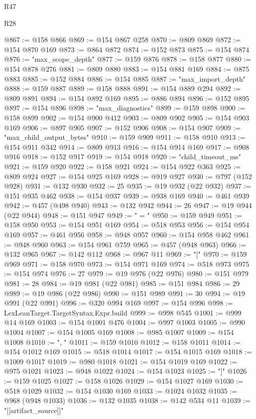 \begin{lexlean}{R47}
\begin{lexlean}{R28}
\begin{coremodule}
{{{{{{{{{{{{{{{{{{{{{{{{{{{{{{{{{{{{{{{{{{{{{{{{{{{{{{{{{{{{{{{{{{{{{{{{{{{{{{{{{{{{{{{{{{{{{{{{{{{{{{{{{{{{{{{{{{{{{{{{{{{{{{{{{{{{{@867 := @158 @866
@869 := @154 @867 @258
@870 := @809 @869
@872 := @154 @870 @169
@873 := @864 @872
@874 := @152 @873
@875 := @154 @874
@876 := "max_scope_depth"
@877 := @159 @876
@878 := @158 @877
@880 := @154 @878 @276
@881 := @809 @880
@883 := @154 @881 @169
@884 := @875 @883
@885 := @152 @884
@886 := @154 @885
@887 := "max_import_depth"
@888 := @159 @887
@889 := @158 @888
@891 := @154 @889 @294
@892 := @809 @891
@894 := @154 @892 @169
@895 := @886 @894
@896 := @152 @895
@897 := @154 @896
@898 := "max_diagnostics"
@899 := @159 @898
@900 := @158 @899
@902 := @154 @900 @412
@903 := @809 @902
@905 := @154 @903 @169
@906 := @897 @905
@907 := @152 @906
@908 := @154 @907
@909 := "max_child_output_bytes"
@910 := @159 @909
@911 := @158 @910
@913 := @154 @911 @342
@914 := @809 @913
@916 := @154 @914 @169
@917 := @908 @916
@918 := @152 @917
@919 := @154 @918
@920 := "child_timeout_ms"
@921 := @159 @920
@922 := @158 @921
@924 := @154 @922 @363
@925 := @809 @924
@927 := @154 @925 @169
@928 := @919 @927
@930 := @797 (@152 @928)
@931 := @132 @930
@932 := 25
@935 := @19 @932 (@22 @932)
@937 := @151 @935 @462
@938 := @154 @937
@939 := @938 @169
@940 := @461 @939
@942 := @457 (@498 @940)
@943 := @132 @942
@944 := 26
@947 := @19 @944 (@22 @944)
@948 := @151 @947
@949 := " = "
@950 := @159 @949
@951 := @158 @950
@953 := @154 @951 @169
@954 := @518 @953
@956 := @154 @954 @169
@957 := @461 @956
@958 := @948 @957
@960 := @154 @958 @462
@961 := @948 @960
@963 := @154 @961 @759
@965 := @457 (@948 @963)
@966 := @132 @965
@967 := @142 @112
@968 := @967 @11
@969 := "["
@970 := @159 @969
@971 := @158 @970
@973 := @154 @971 @169
@974 := @518 @973
@975 := @154 @974
@976 := 27
@979 := @19 @976 (@22 @976)
@980 := @151 @979
@981 := 28
@984 := @19 @981 (@22 @981)
@985 := @151 @984
@986 := 29
@989 := @19 @986 (@22 @986)
@990 := @151 @989
@991 := 30
@994 := @19 @991 (@22 @991)
@996 := @320 @994 @169
@997 := @154 @996
@998 := LexLeanTarget.TargetSyntax.Expr.build
@999 := @998 @545
@1001 := @999 @14 @169
@1003 := @154 @1001 @476
@1004 := @997 @1003
@1005 := @990 @1004
@1007 := @154 @1005 @169
@1008 := @985 @1007
@1009 := @154 @1008
@1010 := ", "
@1011 := @159 @1010
@1012 := @158 @1011
@1014 := @154 @1012 @169
@1015 := @518 @1014
@1017 := @154 @1015 @169
@1018 := @1009 @1017
@1019 := @980 @1018
@1021 := @154 @1019 @169
@1022 := @975 @1021
@1023 := @948 @1022
@1024 := @154 @1023
@1025 := "]"
@1026 := @159 @1025
@1027 := @158 @1026
@1029 := @154 @1027 @169
@1030 := @518 @1029
@1032 := @154 @1030 @169
@1033 := @1024 @1032
@1035 := @968 (@948 @1033)
@1036 := @132 @1035
@1038 := @142 @534 @11
@1039 := "[[artifact_source]]"
}}}}}}}}}}}}}}}}}}}}}}}}}}}}}}}}}}}}}}}}}}}}}}}}}}}}}}}}}}}}}}}}}}}}}}}}}}}}}}}}}}}}}}}}}}}}}}}}}}}}}}}}}}}}}}}}}}}}}}}}}}}}}}}}}}}}}
\end{coremodule}
\end{lexlean}
\end{lexlean}

